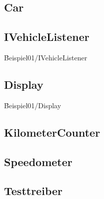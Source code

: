 \subsection{Car}

\subsection{IVehicleListener}
\h{Beispiel01/IVehicleListener}

\subsection{Display}
\h{Beispiel01/Display}

\subsection{KilometerCounter}

\subsection{Speedometer}

\subsection{Testtreiber}


